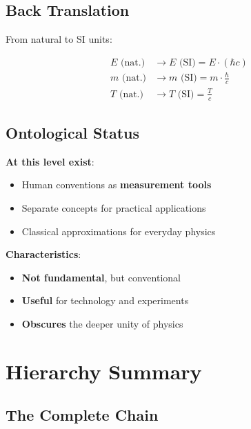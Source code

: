 	\subsection{Back Translation}
	
	From natural to SI units:
	
	\begin{align}
		E \text{ (nat.)} &\to E \text{ (SI)} = E \cdot (\hbar c) \\
		m \text{ (nat.)} &\to m \text{ (SI)} = m \cdot \frac{\hbar}{c} \\
		T \text{ (nat.)} &\to T \text{ (SI)} = \frac{T}{c}
	\end{align}
	
	\subsection{Ontological Status}
	
	\textbf{At this level exist}:
	\begin{itemize}
		\item Human conventions as \textbf{measurement tools}
		\item Separate concepts for practical applications
		\item Classical approximations for everyday physics
	\end{itemize}
	
	\textbf{Characteristics}:
	\begin{itemize}
		\item \textbf{Not fundamental}, but conventional
		\item \textbf{Useful} for technology and experiments
		\item \textbf{Obscures} the deeper unity of physics
	\end{itemize}
	
	\section{Hierarchy Summary}
	
	\subsection{The Complete Chain}
	
